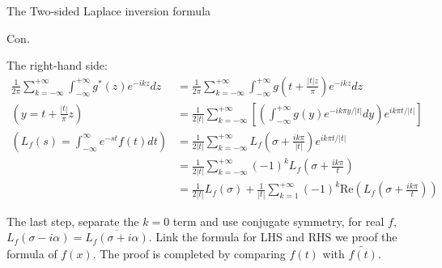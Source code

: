 \documentclass{beamer}
\begin{document}
\begin{frame}{The Two-sided Laplace inversion formula}


    {\footnotesize \scriptsize
    \par Con.
    \par The right-hand side:
    \begin{align*}
       \frac{1}{2\pi} \sum_{k=-\infty}^{+\infty} \int_{-\infty}^{+\infty} g^*(z)e^{-ikz} dz &= 
       \frac{1}{2\pi} \sum_{k=-\infty}^{+\infty} \int_{-\infty}^{+\infty} g\left( t + \frac{|t|z}{\pi} \right) e^{-ikz} dz\\
       \left(y = t+\frac{|t|}{\pi}z\right)&= \frac{1}{2|t|} \sum_{k=-\infty}^{+\infty} \left[ \left( \int_{-\infty}^{+\infty} g(y)e^{-ik\pi y/|t|} dy \right) e^{ik\pi t/|t|} \right]\\
       \left( L_f(s) = \int_{-\infty}^{\infty} e^{-st}f(t)  dt\right)& = \frac{1}{2|t|} \sum_{k=-\infty}^{+\infty} L_f \left( \sigma + \frac{ik\pi}{|t|} \right) e^{ik\pi t/|t|}\\
       & = \frac{1}{2|t|} \sum_{k=-\infty}^{+\infty} (-1)^k L_f \left( \sigma + \frac{ik\pi}{t} \right)\\
       & = \frac{1}{2|t|} L_f(\sigma) + \frac{1}{|t|} \sum_{k=1}^{+\infty} (-1)^k \text{Re} \left( L_f \left( \sigma + \frac{ik\pi}{t} \right) \right)
    \end{align*}
    \par The last step, separate the $k=0$ term and use conjugate 
    symmetry, for real \( f \), \( L_f(\sigma - i\alpha) = \overline{L_f(\sigma + i\alpha)} \). Link the formula for LHS and RHS we proof the formula of $f(x)$. 
    The proof is completed by comparing $f(t)$ with $\tilde{f(t)}$.

    }
    
\end{frame}
\end{document}
